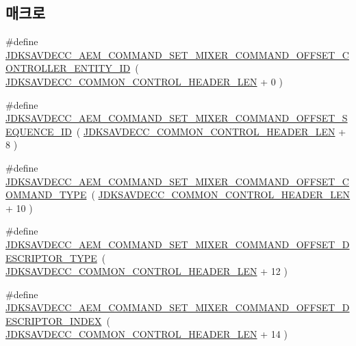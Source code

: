 \subsection*{매크로}
\begin{DoxyCompactItemize}
\item 
\#define \hyperlink{group__command__set__mixer_gab8257fc8827419ae15a79a80180ed978}{J\+D\+K\+S\+A\+V\+D\+E\+C\+C\+\_\+\+A\+E\+M\+\_\+\+C\+O\+M\+M\+A\+N\+D\+\_\+\+S\+E\+T\+\_\+\+M\+I\+X\+E\+R\+\_\+\+C\+O\+M\+M\+A\+N\+D\+\_\+\+O\+F\+F\+S\+E\+T\+\_\+\+C\+O\+N\+T\+R\+O\+L\+L\+E\+R\+\_\+\+E\+N\+T\+I\+T\+Y\+\_\+\+ID}~( \hyperlink{group__jdksavdecc__avtp__common__control__header_gaae84052886fb1bb42f3bc5f85b741dff}{J\+D\+K\+S\+A\+V\+D\+E\+C\+C\+\_\+\+C\+O\+M\+M\+O\+N\+\_\+\+C\+O\+N\+T\+R\+O\+L\+\_\+\+H\+E\+A\+D\+E\+R\+\_\+\+L\+EN} + 0 )
\item 
\#define \hyperlink{group__command__set__mixer_gab2253864b94793b4aa9ba6a191982580}{J\+D\+K\+S\+A\+V\+D\+E\+C\+C\+\_\+\+A\+E\+M\+\_\+\+C\+O\+M\+M\+A\+N\+D\+\_\+\+S\+E\+T\+\_\+\+M\+I\+X\+E\+R\+\_\+\+C\+O\+M\+M\+A\+N\+D\+\_\+\+O\+F\+F\+S\+E\+T\+\_\+\+S\+E\+Q\+U\+E\+N\+C\+E\+\_\+\+ID}~( \hyperlink{group__jdksavdecc__avtp__common__control__header_gaae84052886fb1bb42f3bc5f85b741dff}{J\+D\+K\+S\+A\+V\+D\+E\+C\+C\+\_\+\+C\+O\+M\+M\+O\+N\+\_\+\+C\+O\+N\+T\+R\+O\+L\+\_\+\+H\+E\+A\+D\+E\+R\+\_\+\+L\+EN} + 8 )
\item 
\#define \hyperlink{group__command__set__mixer_ga3a3fcb3a0d1e591405146fccc3e868a6}{J\+D\+K\+S\+A\+V\+D\+E\+C\+C\+\_\+\+A\+E\+M\+\_\+\+C\+O\+M\+M\+A\+N\+D\+\_\+\+S\+E\+T\+\_\+\+M\+I\+X\+E\+R\+\_\+\+C\+O\+M\+M\+A\+N\+D\+\_\+\+O\+F\+F\+S\+E\+T\+\_\+\+C\+O\+M\+M\+A\+N\+D\+\_\+\+T\+Y\+PE}~( \hyperlink{group__jdksavdecc__avtp__common__control__header_gaae84052886fb1bb42f3bc5f85b741dff}{J\+D\+K\+S\+A\+V\+D\+E\+C\+C\+\_\+\+C\+O\+M\+M\+O\+N\+\_\+\+C\+O\+N\+T\+R\+O\+L\+\_\+\+H\+E\+A\+D\+E\+R\+\_\+\+L\+EN} + 10 )
\item 
\#define \hyperlink{group__command__set__mixer_gaccc4b80aa124ffdc33365fa6e666c3dd}{J\+D\+K\+S\+A\+V\+D\+E\+C\+C\+\_\+\+A\+E\+M\+\_\+\+C\+O\+M\+M\+A\+N\+D\+\_\+\+S\+E\+T\+\_\+\+M\+I\+X\+E\+R\+\_\+\+C\+O\+M\+M\+A\+N\+D\+\_\+\+O\+F\+F\+S\+E\+T\+\_\+\+D\+E\+S\+C\+R\+I\+P\+T\+O\+R\+\_\+\+T\+Y\+PE}~( \hyperlink{group__jdksavdecc__avtp__common__control__header_gaae84052886fb1bb42f3bc5f85b741dff}{J\+D\+K\+S\+A\+V\+D\+E\+C\+C\+\_\+\+C\+O\+M\+M\+O\+N\+\_\+\+C\+O\+N\+T\+R\+O\+L\+\_\+\+H\+E\+A\+D\+E\+R\+\_\+\+L\+EN} + 12 )
\item 
\#define \hyperlink{group__command__set__mixer_ga69eccf89c1d3b088bb5009c5603d4147}{J\+D\+K\+S\+A\+V\+D\+E\+C\+C\+\_\+\+A\+E\+M\+\_\+\+C\+O\+M\+M\+A\+N\+D\+\_\+\+S\+E\+T\+\_\+\+M\+I\+X\+E\+R\+\_\+\+C\+O\+M\+M\+A\+N\+D\+\_\+\+O\+F\+F\+S\+E\+T\+\_\+\+D\+E\+S\+C\+R\+I\+P\+T\+O\+R\+\_\+\+I\+N\+D\+EX}~( \hyperlink{group__jdksavdecc__avtp__common__control__header_gaae84052886fb1bb42f3bc5f85b741dff}{J\+D\+K\+S\+A\+V\+D\+E\+C\+C\+\_\+\+C\+O\+M\+M\+O\+N\+\_\+\+C\+O\+N\+T\+R\+O\+L\+\_\+\+H\+E\+A\+D\+E\+R\+\_\+\+L\+EN} + 14 )

\end{DoxyCompactItemize}
